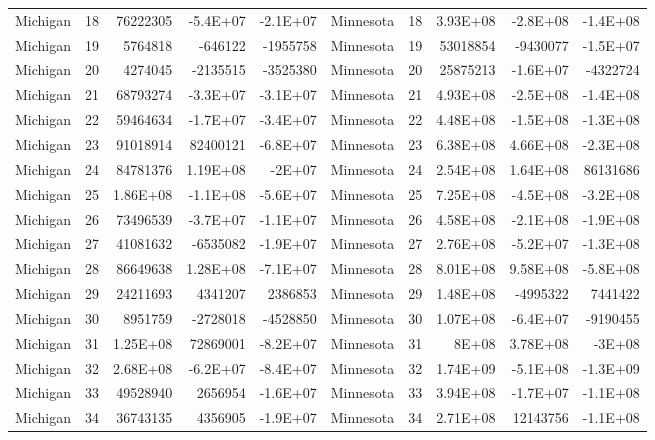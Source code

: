 \begin{table}[]
\begin{tabular}{lrrrrlrrrr}
		Michigan &  18 & 76222305 & -5.4E+07 & -2.1E+07 & Minnesota &  18 & 3.93E+08 & -2.8E+08 & -1.4E+08 \\
		Michigan &  19 & 5764818 & -646122 & -1955758 & Minnesota &  19 & 53018854 & -9430077 & -1.5E+07 \\
		Michigan &  20 & 4274045 & -2135515 & -3525380 & Minnesota &  20 & 25875213 & -1.6E+07 & -4322724 \\
		Michigan &  21 & 68793274 & -3.3E+07 & -3.1E+07 & Minnesota &  21 & 4.93E+08 & -2.5E+08 & -1.4E+08 \\
		Michigan &  22 & 59464634 & -1.7E+07 & -3.4E+07 & Minnesota &  22 & 4.48E+08 & -1.5E+08 & -1.3E+08 \\
		Michigan &  23 & 91018914 & 82400121 & -6.8E+07 & Minnesota &  23 & 6.38E+08 & 4.66E+08 & -2.3E+08 \\
		Michigan &  24 & 84781376 & 1.19E+08 & -2E+07 & Minnesota &  24 & 2.54E+08 & 1.64E+08 & 86131686 \\
		Michigan &  25 & 1.86E+08 & -1.1E+08 & -5.6E+07 & Minnesota &  25 & 7.25E+08 & -4.5E+08 & -3.2E+08 \\
		Michigan &  26 & 73496539 & -3.7E+07 & -1.1E+07 & Minnesota &  26 & 4.58E+08 & -2.1E+08 & -1.9E+08 \\
		Michigan &  27 & 41081632 & -6535082 & -1.9E+07 & Minnesota &  27 & 2.76E+08 & -5.2E+07 & -1.3E+08 \\
		Michigan &  28 & 86649638 & 1.28E+08 & -7.1E+07 & Minnesota &  28 & 8.01E+08 & 9.58E+08 & -5.8E+08 \\
		Michigan &  29 & 24211693 & 4341207 & 2386853 & Minnesota &  29 & 1.48E+08 & -4995322 & 7441422 \\
		Michigan &  30 & 8951759 & -2728018 & -4528850 & Minnesota &  30 & 1.07E+08 & -6.4E+07 & -9190455 \\
		Michigan &  31 & 1.25E+08 & 72869001 & -8.2E+07 & Minnesota &  31 & 8E+08 & 3.78E+08 & -3E+08 \\
		Michigan &  32 & 2.68E+08 & -6.2E+07 & -8.4E+07 & Minnesota &  32 & 1.74E+09 & -5.1E+08 & -1.3E+09 \\
		Michigan &  33 & 49528940 & 2656954 & -1.6E+07 & Minnesota &  33 & 3.94E+08 & -1.7E+07 & -1.1E+08 \\
		Michigan &  34 & 36743135 & 4356905 & -1.9E+07 & Minnesota &  34 & 2.71E+08 & 12143756 & -1.1E+08
	\end{tabular}
\end{table}

